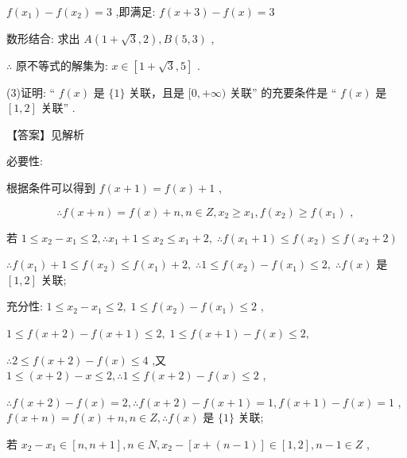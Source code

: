 \documentclass[10pt]{article}
\begin{document}
\(f\left( {x}_{1}\right)  - f\left( {x}_{2}\right)  = 3\) ,即满足: \(f\left( {x + 3}\right)  - f\left( x\right)  = 3\)

数形结合: 求出 \(A\left( {1 + \sqrt{3},2}\right) ,B\left( {5,3}\right)\) ,

\(\therefore\) 原不等式的解集为: \(x \in  \left\lbrack  {1 + \sqrt{3},5}\right\rbrack\) .

(3)证明: “ \(f\left( x\right)\) 是 \(\{ 1\}\) 关联，且是 \(\lbrack 0, + \infty )\) 关联” 的充要条件是 “ \(f\left( x\right)\) 是 \(\left\lbrack  {1,2}\right\rbrack\) 关联” .

【答案】见解析

必要性:

根据条件可以得到 \(f\left( {x + 1}\right)  = f\left( x\right)  + 1\) ,

\[
\therefore f\left( {x + n}\right)  = f\left( x\right)  + n,n \in  Z,{x}_{2} \geq  {x}_{1},f\left( {x}_{2}\right)  \geq  f\left( {x}_{1}\right) \text{ , }
\]

若 \(1 \leq  {x}_{2} - {x}_{1} \leq  2,\therefore {x}_{1} + 1 \leq  {x}_{2} \leq  {x}_{1} + 2,\;\therefore f\left( {{x}_{1} + 1}\right)  \leq  f\left( {x}_{2}\right)  \leq  f\left( {{x}_{2} + 2}\right)\)

\(\therefore f\left( {x}_{1}\right)  + 1 \leq  f\left( {x}_{2}\right)  \leq  f\left( {x}_{1}\right)  + 2,\;\therefore 1 \leq  f\left( {x}_{2}\right)  - f\left( {x}_{1}\right)  \leq  2,\;\therefore f\left( x\right)\) 是 \(\left\lbrack  {1,2}\right\rbrack\) 关联;

充分性: \(1 \leq  {x}_{2} - {x}_{1} \leq  2,\;1 \leq  f\left( {x}_{2}\right)  - f\left( {x}_{1}\right)  \leq  2\) ,

\(1 \leq  f\left( {x + 2}\right)  - f\left( {x + 1}\right)  \leq  2,\;1 \leq  f\left( {x + 1}\right)  - f\left( x\right)  \leq  2,\)

\(\therefore 2 \leq  f\left( {x + 2}\right)  - f\left( x\right)  \leq  4\) ,又 \(1 \leq  \left( {x + 2}\right)  - x \leq  2,\therefore 1 \leq  f\left( {x + 2}\right)  - f\left( x\right)  \leq  2\) ,

\(\therefore f\left( {x + 2}\right)  - f\left( x\right)  = 2,\therefore f\left( {x + 2}\right)  - f\left( {x + 1}\right)  = 1,f\left( {x + 1}\right)  - f\left( x\right)  = 1\) , \(f\left( {x + n}\right)  = f\left( x\right)  + n,n \in  Z,\therefore f\left( x\right)\) 是 \(\{ 1\}\) 关联;

若 \({x}_{2} - {x}_{1} \in  \left\lbrack  {n,n + 1}\right\rbrack  ,n \in  N,{x}_{2} - \left\lbrack  {x + \left( {n - 1}\right) }\right\rbrack   \in  \left\lbrack  {1,2}\right\rbrack  ,n - 1 \in  Z\) ,
\end{document}
